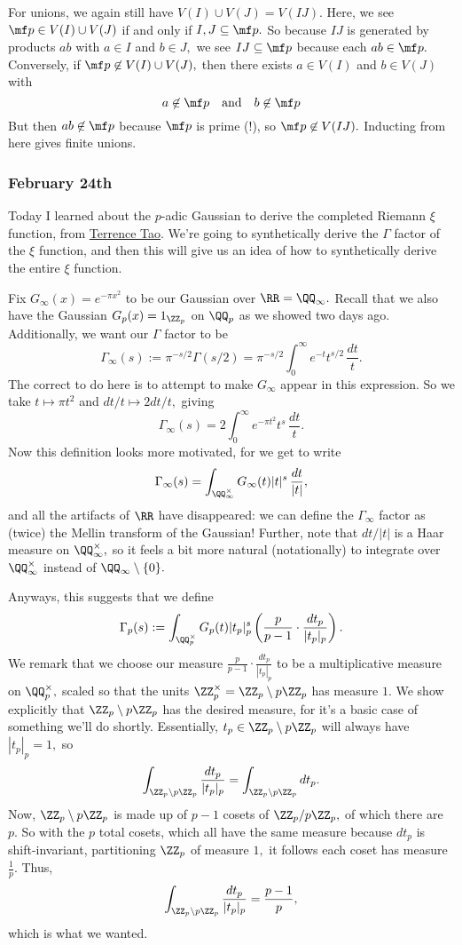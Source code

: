 For unions, we again still have $V(I)\cup V(J)=V(IJ).$ Here, we see $\mf p\in V(I)\cup V(J)$ if and only if $I,J\subseteq\mf p.$ So because $IJ$ is generated by products $ab$ with $a\in I$ and $b\in J,$ we see $IJ\subseteq\mf p$ because each $ab\in\mf p.$ Conversely, if $\mf p\not\in V(I)\cup V(J),$ then there exists $a\in V(I)$ and $b\in V(J)$ with
\[a\not\in\mf p\quad\text{and}\quad b\not\in\mf p\]
But then $ab\not\in\mf p$ because $\mf p$ is prime (!), so $\mf p\not\in V(IJ).$ Inducting from here gives finite unions.

\subsubsection{February 24th}
Today I learned about the $p$-adic Gaussian to derive the completed Riemann $\xi$ function, from \href{https://terrytao.wordpress.com/2008/07/27/tates-proof-of-the-functional-equation/}{Terrence Tao}. We're going to synthetically derive the $\Gamma$ factor of the $\xi$ function, and then this will give us an idea of how to synthetically derive the entire $\xi$ function.

Fix $G_\infty(x)=e^{-\pi x^2}$ to be our Gaussian over $\RR=\QQ_\infty.$ Recall that we also have the Gaussian $G_p(x)=1_{\ZZ_p}$ on $\QQ_p$ as we showed two days ago. Additionally, we want our $\Gamma$ factor to be
\[\Gamma_\infty(s):=\pi^{-s/2}\Gamma(s/2)=\pi^{-s/2}\int_0^\infty e^{-t}t^{s/2}\,\frac{dt}t.\]
The correct to do here is to attempt to make $G_\infty$ appear in this expression. So we take $t\mapsto\pi t^2$ and $dt/t\mapsto 2dt/t,$ giving
\[\Gamma_\infty(s)=2\int_0^\infty e^{-\pi t^2}t^s\,\frac{dt}t.\]
Now this definition looks more motivated, for we get to write
\[\Gamma_\infty(s)=\int_{\QQ_\infty^\times}G_\infty(t)|t|^s\,\frac{dt}{|t|},\]
and all the artifacts of $\RR$ have disappeared: we can define the $\Gamma_\infty$ factor as (twice) the Mellin transform of the Gaussian! Further, note that $dt/|t|$ is a Haar measure on $\QQ_\infty^\times,$ so it feels a bit more natural (notationally) to integrate over $\QQ_\infty^\times$ instead of $\QQ_\infty\setminus\{0\}.$

Anyways, this suggests that we define
\[\Gamma_p(s):=\int_{\QQ_p^\times}G_p(t)|t_p|_p^s\left(\frac p{p-1}\cdot\frac{dt_p}{|t_p|_p}\right).\]
We remark that we choose our measure $\frac p{p-1}\cdot\frac{dt_p}{|t_p|_p}$ to be a multiplicative measure on $\QQ_p^\times,$ scaled so that the units $\ZZ_p^\times=\ZZ_p\setminus p\ZZ_p$ has measure $1.$ We show explicitly that $\ZZ_p\setminus p\ZZ_p$ has the desired measure, for it's a basic case of something we'll do shortly. Essentially, $t_p\in\ZZ_p\setminus p\ZZ_p$ will always have $|t_p|_p=1,$ so
\[\int_{\ZZ_p\setminus p\ZZ_p}\frac{dt_p}{|t_p|_p}=\int_{\ZZ_p\setminus p\ZZ_p}dt_p.\]
Now, $\ZZ_p\setminus p\ZZ_p$ is made up of $p-1$ cosets of $\ZZ_p/p\ZZ_p,$ of which there are $p.$ So with the $p$ total cosets, which all have the same measure because $dt_p$ is shift-invariant, partitioning $\ZZ_p$ of measure $1,$ it follows each coset has measure $\frac1p.$ Thus,
\[\int_{\ZZ_p\setminus p\ZZ_p}\frac{dt_p}{|t_p|_p}=\frac{p-1}p,\]
which is what we wanted.

